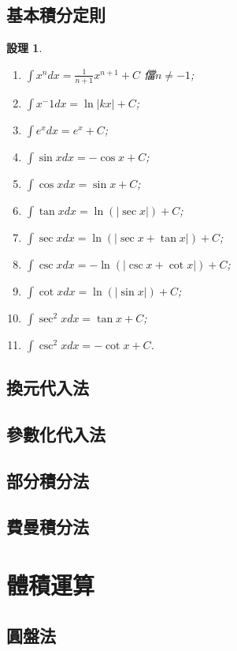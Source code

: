 \documentclass[12pt]{article}
\newtheorem*{proposition}{設理}
\begin{document}
    \subsection*{基本積分定則}
    \begin{proposition}
        \begin{enumerate}
            \item $\int x^n dx = \frac{1}{n+1}x^{n+1} + C$ 儅$n\neq -1$;
            \item $\int x^-1 dx = \ln{|kx|} + C$;
            \item $\int e^x dx = e^x + C$;
            \item $\int \sin{x} dx = -\cos{x} + C$;
            \item $\int \cos{x} dx = \sin{x} + C$;
            \item $\int \tan{x} dx = \ln(|\sec{x}|) + C$;
            \item $\int \sec{x} dx = \ln(|\sec{x}+\tan{x}|) + C$;
            \item $\int \csc{x} dx = -\ln(|\csc{x}+\cot{x}|) + C$;
            \item $\int \cot{x} dx = \ln(|\sin{x}|) + C$;
            \item $\int \sec^2{x} dx = \tan{x} + C$;
            \item $\int \csc^2{x} dx = -\cot{x} + C$.
        \end{enumerate}
    \end{proposition}
    \subsection*{換元代入法}
    \subsection*{參數化代入法}
    \subsection*{部分積分法}
    \subsection*{費曼積分法}
    \section*{體積運算}
    \subsection*{圓盤法}
\end{document}
